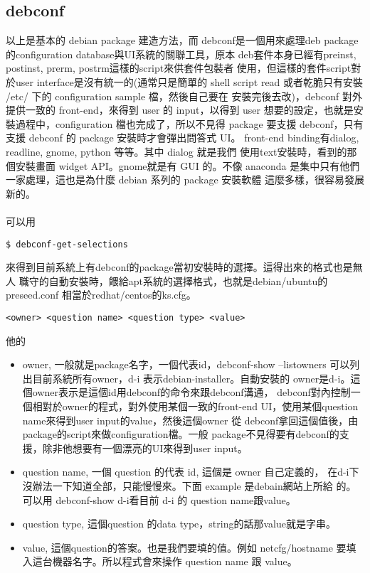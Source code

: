   \subsection{debconf}
  以上是基本的 debian package 建造方法，而 debconf是一個用來處理deb package
  的configuration database與UI系統的關聯工具，原本
  deb套件本身已經有preinst, postinst, prerm, postrm這樣的script來供套件包裝者
  使用，但這樣的套件script對於user interface是沒有統一的(通常只是簡單的 shell 
  script read 或者乾脆只有安裝 /etc/ 下的 configuration sample 檔，然後自己要在
  安裝完後去改)，debconf 對外提供一致的 front-end，來得到 user 的 input，以得到
  user 想要的設定，也就是安裝過程中，configuration 檔也完成了，所以不見得
  package 要支援 debconf，只有支援 debconf 的 package 安裝時才會彈出問答式 UI。
  front-end binding有dialog, readline, gnome, python 等等。其中 dialog 就是我們
  使用text安裝時，看到的那個安裝畫面 widget API。gnome就是有 GUI 的。不像
  anaconda 是集中只有他們一家處理，這也是為什麼 debian 系列的 package 安裝軟體
  這麼多樣，很容易發展新的。
  \\\\
  可以用
  \begin{verbatim}
$ debconf-get-selections
  \end{verbatim}
  來得到目前系統上有debconf的package當初安裝時的選擇。這得出來的格式也是無人
  職守的自動安裝時，餵給apt系統的選擇格式，也就是debian/ubuntu的preseed.conf
  相當於redhat/centos的ks.cfg。
  \begin{verbatim}
<owner> <question name> <question type> <value>
  \end{verbatim}
  他的
  \begin{itemize}
    \item owner, 一般就是package名字，一個代表id，debconf-show --listowners 
      可以列出目前系統所有owner，d-i 表示debian-installer。自動安裝的
      owner是d-i。這個owner表示是這個id用debconf的命令來跟debconf溝通，
      debconf對內控制一個相對於owner的程式，對外使用某個一致的front-end
      UI，使用某個question name來得到user input的value，然後這個owner 從
      debconf拿回這個值後，由package的script來做configuration檔。一般
      package不見得要有debconf的支援，除非他想要有一個漂亮的UI來得到user input。
    \item question name, 一個 question 的代表 id, 這個是 owner 自己定義的，
      在d-i下沒辦法一下知道全部，只能慢慢來。下面 example 是debain網站上所給
      的。可以用 debconf-show d-i看目前 d-i 的 question name跟value。
    \item question type, 這個question 的data type，string的話那value就是字串。
    \item value, 這個question的答案。也是我們要填的值。例如 netcfg/hostname
      要填入這台機器名字。所以程式會來操作 question name 跟 value。
  \end{itemize}
